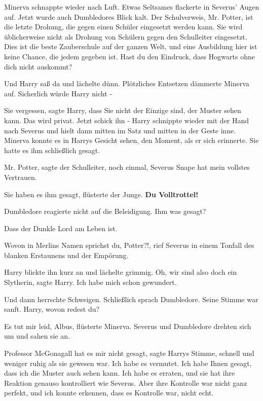 Minerva schnappte wieder nach Luft. Etwas Seltsames flackerte in Severus' Augen
auf. Jetzt wurde auch Dumbledores Blick kalt. \glqq{}Der Schulverweis, Mr.
Potter, ist die letzte Drohung, die gegen einen Schüler eingesetzt werden kann.
Sie wird üblicherweise nicht als Drohung von Schülern gegen den Schulleiter
eingesetzt. Dies ist die beste Zauberschule auf der ganzen Welt, und eine
Ausbildung hier ist keine Chance, die jedem gegeben ist. Hast du den Eindruck,
dass Hogwarts ohne dich nicht auskommt?\grqq{}

Und Harry saß da und lächelte dünn. Plötzliches Entsetzen dämmerte Minerva auf.
Sicherlich würde Harry nicht -

\glqq{}Sie vergessen\grqq{}, sagte Harry, \glqq{}dass Sie nicht der Einzige sind,
der Muster sehen kann. Das wird privat. Jetzt schick ihn -\grqq{} Harry
schnippte wieder mit der Hand nach Severus und hielt dann mitten im Satz und
mitten in der Geste inne. Minerva konnte es in Harrys Gesicht sehen, den Moment,
als er sich erinnerte. Sie hatte es ihm schließlich gesagt.

\glqq{}Mr. Potter\grqq{}, sagte der Schulleiter, \glqq{}noch einmal, Severus Snape
hat mein vollstes Vertrauen.\grqq{}

\glqq{}Sie haben es ihm gesagt\grqq{}, flüsterte der Junge. \glqq{}\textbf{Du
Volltrottel!}\grqq{}

Dumbledore reagierte nicht auf die Beleidigung. \glqq{}Ihm was gesagt?\grqq{}

\glqq{}Dass der Dunkle Lord am Leben ist.\grqq{}

\glqq{}Wovon in Merlins Namen sprichst du, Potter?!\grqq{}, rief Severus in einem
Tonfall des blanken Erstaunens und der Empörung.

Harry blickte ihn kurz an und lächelte grimmig. \glqq{}Oh, wir sind also doch ein
Slytherin\grqq{}, sagte Harry. \glqq{}Ich habe mich schon gewundert.\grqq{}

Und dann herrschte Schweigen. Schließlich sprach Dumbledore. Seine Stimme war
sanft. \glqq{}Harry, wovon redest du?\grqq{}

\glqq{}Es tut mir leid, Albus\grqq{}, flüsterte Minerva. Severus und Dumbledore
drehten sich um und sahen sie an.

\glqq{}Professor McGonagall hat es mir nicht gesagt\grqq{}, sagte Harrys Stimme,
schnell und weniger ruhig als sie gewesen war. \glqq{}Ich habe es vermutet. Ich
habe Ihnen gesagt, dass ich die Muster auch sehen kann. Ich habe es erraten, und
sie hat ihre Reaktion genauso kontrolliert wie Severus. Aber ihre Kontrolle war
nicht ganz perfekt, und ich konnte erkennen, dass es Kontrolle war, nicht
echt.\grqq{}

